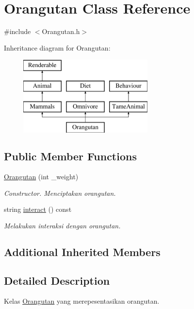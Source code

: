 \hypertarget{classOrangutan}{\section{Orangutan Class Reference}
\label{classOrangutan}
}


{\ttfamily \#include $<$Orangutan.\+h$>$}

Inheritance diagram for Orangutan\+:\begin{figure}[H]
\begin{center}
\leavevmode
\includegraphics[height=4.000000cm]{classOrangutan}
\end{center}
\end{figure}
\subsection*{Public Member Functions}
\begin{DoxyCompactItemize}
\item 
\hypertarget{classOrangutan_a445822c4e7fa376eec207605704afae9}{\hyperlink{classOrangutan_a445822c4e7fa376eec207605704afae9}{Orangutan} (int \+\_\+weight)}\label{classOrangutan_a445822c4e7fa376eec207605704afae9}

\begin{DoxyCompactList}\small\item\em Constructor. Menciptakan orangutan. \end{DoxyCompactList}\item 
string \hyperlink{classOrangutan_a130b3521fa378e99cf78ffcf5883a7b0}{interact} () const 
\begin{DoxyCompactList}\small\item\em Melakukan interaksi dengan orangutan. \end{DoxyCompactList}\end{DoxyCompactItemize}
\subsection*{Additional Inherited Members}


\subsection{Detailed Description}
Kelas \hyperlink{classOrangutan}{Orangutan} yang merepesentasikan orangutan. 

